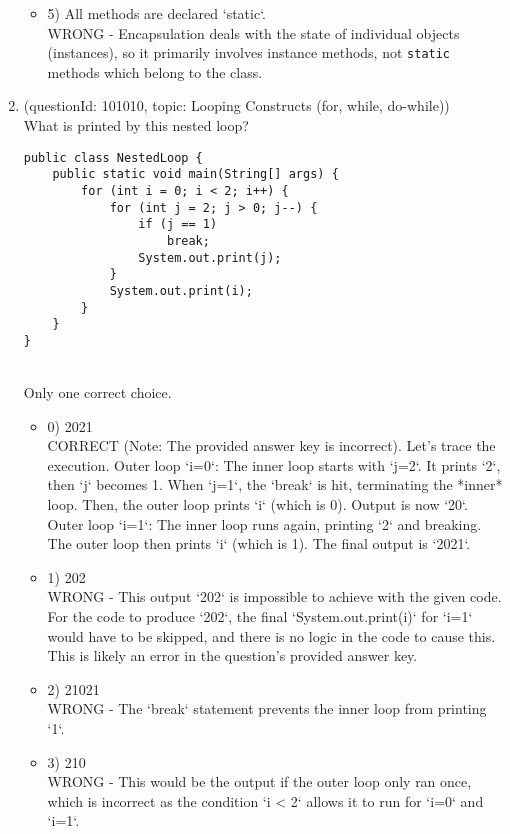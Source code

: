 \documentclass[12pt]{article}
\begin{document}
\begin{enumerate}[label=(\arabic*)]
\begin{itemize}
\item 5) All methods are declared `static`.
 \\ 
WRONG - Encapsulation deals with the state of individual objects (instances), so it primarily involves instance methods, not \verb|static| methods which belong to the class.

\end{itemize}
\item (questionId: 101010, topic: Looping Constructs (for, while, do-while)) \\ 
What is printed by this nested loop?\n\begin{verbatim}
public class NestedLoop {
    public static void main(String[] args) {
        for (int i = 0; i < 2; i++) {
            for (int j = 2; j > 0; j--) {
                if (j == 1)
                    break;
                System.out.print(j);
            }
            System.out.print(i);
        }
    }
}
\end{verbatim}
\\ \noindent Only one correct choice. 
\begin{itemize}
\item 0) 2021
 \\ 
CORRECT (Note: The provided answer key is incorrect). Let's trace the execution. Outer loop `i=0`: The inner loop starts with `j=2`. It prints `2`, then `j` becomes 1. When `j=1`, the `break` is hit, terminating the *inner* loop. Then, the outer loop prints `i` (which is 0). Output is now `20`. Outer loop `i=1`: The inner loop runs again, printing `2` and breaking. The outer loop then prints `i` (which is 1). The final output is `2021`.

\item 1) 202
 \\ 
WRONG - This output `202` is impossible to achieve with the given code. For the code to produce `202`, the final `System.out.print(i)` for `i=1` would have to be skipped, and there is no logic in the code to cause this. This is likely an error in the question's provided answer key.

\item 2) 21021
 \\ 
WRONG - The `break` statement prevents the inner loop from printing `1`.

\item 3) 210
 \\ 
WRONG - This would be the output if the outer loop only ran once, which is incorrect as the condition `i < 2` allows it to run for `i=0` and `i=1`.


\end{itemize}
\end{enumerate}
\end{document}
